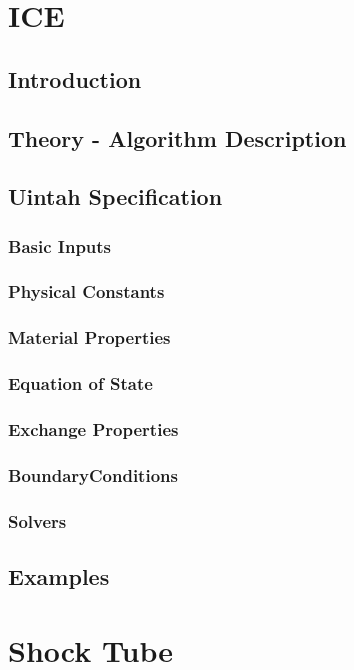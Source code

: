 
\section{ICE}

\subsection{Introduction}

\subsection{Theory - Algorithm Description}

\subsection{Uintah Specification}

\subsubsection{Basic Inputs}
\subsubsection{Physical Constants}
\subsubsection{Material Properties}
\subsubsection{Equation of State}
\subsubsection{Exchange Properties}
\subsubsection{BoundaryConditions}
\subsubsection{Solvers}
\subsection{Examples}
\section*{\center Shock Tube}
